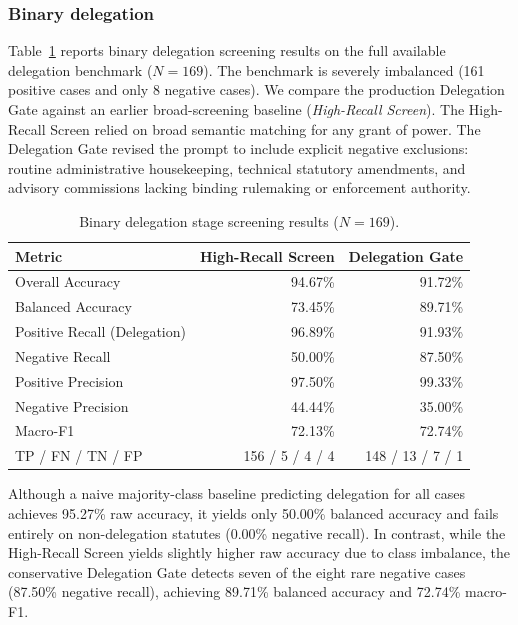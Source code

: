 \documentclass[runningheads]{llncs}
\begin{document}
\subsubsection{Binary delegation}

Table~\ref{tab:binary} reports binary delegation screening results on the full available delegation benchmark ($N=169$). The benchmark is severely imbalanced (161 positive cases and only 8 negative cases). We compare the production Delegation Gate against an earlier broad-screening baseline (\emph{High-Recall Screen}). The High-Recall Screen relied on broad semantic matching for any grant of power. The Delegation Gate revised the prompt to include explicit negative exclusions: routine administrative housekeeping, technical statutory amendments, and advisory commissions lacking binding rulemaking or enforcement authority.

\begin{table}[htbp]
\centering
\caption{Binary delegation stage screening results ($N=169$).}
\label{tab:binary}
\small
\begin{tabular}{@{}l@{\hspace{3pt}}rr@{}}
\toprule
\textbf{Metric} & \textbf{High-Recall Screen} & \textbf{Delegation Gate} \\
\midrule
Overall Accuracy & 94.67\% & 91.72\% \\
Balanced Accuracy & 73.45\% & 89.71\% \\
Positive Recall (Delegation) & 96.89\% & 91.93\% \\
Negative Recall & 50.00\% & 87.50\% \\
Positive Precision & 97.50\% & 99.33\% \\
Negative Precision & 44.44\% & 35.00\% \\
Macro-F1 & 72.13\% & 72.74\% \\
\midrule
TP / FN / TN / FP & 156 / 5 / 4 / 4 & 148 / 13 / 7 / 1 \\
\bottomrule
\end{tabular}
\end{table}

Although a naive majority-class baseline predicting delegation for all cases achieves 95.27\% raw accuracy, it yields only 50.00\% balanced accuracy and fails entirely on non-delegation statutes (0.00\% negative recall). In contrast, while the High-Recall Screen yields slightly higher raw accuracy due to class imbalance, the conservative Delegation Gate detects seven of the eight rare negative cases (87.50\% negative recall), achieving 89.71\% balanced accuracy and 72.74\% macro-F1.
\vspace{-0.5cm}
\end{document}
